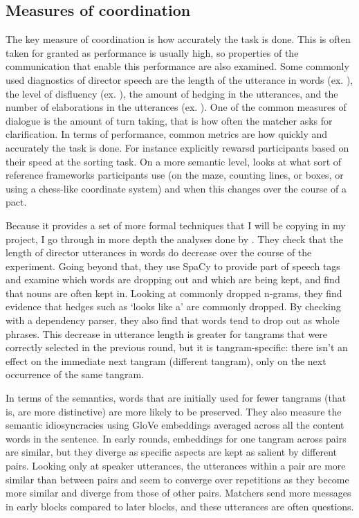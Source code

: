 \documentclass[11pt]{article}
\begin{document}
	\subsection{Measures of coordination}
	The key measure of coordination is how accurately the task is done. This is often taken for granted as performance is usually high, so properties of the communication that enable this performance are also examined.
	Some commonly used diagnostics of director speech are the length of the utterance in words (ex. \cite{yoonAudienceDesignMultiparty2019}), the level of disfluency (ex. \cite{yoonAudienceDesignMultiparty2019}), the amount of hedging in the utterances, and the number of elaborations in the utterances (ex. \cite{yoonAudienceDesignMultiparty2019}). One of the common measures of dialogue is the amount of turn taking, that is how often the matcher asks for clarification. 	In terms of performance, common metrics are how quickly and accurately the task is done. For instance \cite{weberCulturalConflictMerger2003} explicitly rewarsd participants based on their speed at the sorting task. 	On a more semantic level, \cite{garrodConversationCoordinationConvention1994} looks at what sort of reference frameworks participants use (on the maze, counting lines, or boxes, or using a chess-like coordinate system) and when this changes over the course of a pact. 

	Because it provides a set of more formal techniques that I will be copying in my project, I go through in more depth the analyses done by \cite{hawkinsCharacterizingDynamicsLearning2020}. They check that the length of director utterances in words do decrease over the course of the experiment. Going beyond that, they use SpaCy to provide part of speech tags and examine which words are dropping out and which are being kept, and find that nouns are often kept in. Looking at commonly dropped n-grams, they find evidence that hedges such as `looks like a' are commonly dropped. By checking with a dependency parser, they also find that words tend to drop out as whole phrases. This decrease in utterance length is greater for tangrams that were correctly selected in the previous round, but it is tangram-specific: there isn't an effect on the immediate next tangram (different tangram), only on the next occurrence of the same tangram. 
	
	In terms of the semantics, words that are initially used for fewer tangrams (that is, are more distinctive) are more likely to be preserved. They also measure the semantic idiosyncracies using GloVe embeddings averaged across all the content words in the sentence. In early rounds, embeddings for one tangram across pairs are similar, but they diverge as specific aspects are kept as salient by different pairs. Looking only at speaker utterances, the utterances within a pair are more similar than between pairs and seem to converge over repetitions as they become more similar and diverge from those of other pairs.
	Matchers send more messages in early blocks compared to later blocks, and these utterances are often questions. 
\end{document}
